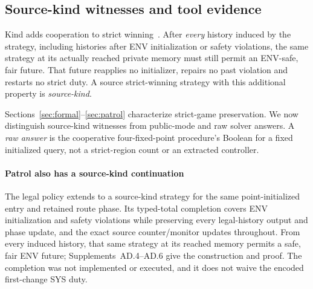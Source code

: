 \subsection{Source-kind witnesses and tool evidence}\label{sec:source-kind}
Kind adds cooperation to strict winning~\cite{kind}. After \emph{every}
history induced by the strategy, including histories after ENV initialization
or safety violations, the same strategy at its actually reached private
memory must still permit an ENV-safe, fair future. That future reapplies no
initializer, repairs no past violation and restarts no strict duty. A source
strict-winning strategy with this additional property is \emph{source-kind}.

Sections~\ref{sec:formal}--\ref{sec:patrol} characterize strict-game
preservation. We now distinguish source-kind witnesses from public-mode
and raw solver answers. A \emph{raw answer} is the
cooperative four-fixed-point procedure's Boolean for a fixed initialized
query, not a strict-region count or an extracted controller.

\paragraph{Patrol also has a source-kind continuation}
The legal policy extends to a source-kind strategy for the same
point-initialized entry and retained route phase. Its typed-total completion
covers ENV initialization and safety violations while preserving every
legal-history output and phase update, and the exact source counter/monitor
updates throughout. From every induced history, that same strategy at its
reached memory permits a safe, fair ENV future; Supplements~AD.4--AD.6 give
the construction and proof. The completion was not implemented or executed,
and it does not waive the encoded first-change SYS duty.
